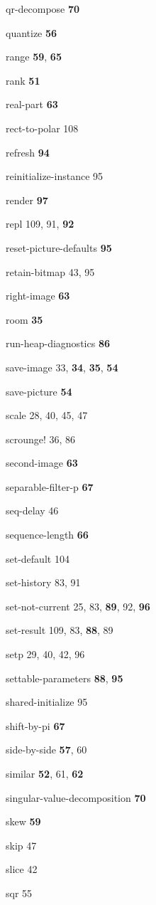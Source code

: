 \begin{theindex}
\item qr-decompose {\bf 70}
\item quantize {\bf 56}
\item range {\bf 59}, {\bf 65}
\item rank {\bf 51}
\item real-part {\bf 63}
\item rect-to-polar 108
\item refresh {\bf 94}
\item reinitialize-instance 95
\item render {\bf 97}
\item repl 109, 91, {\bf 92}
\item reset-picture-defaults {\bf 95}
\item retain-bitmap 43, 95
\item right-image {\bf 63}
\item room {\bf 35}
\item run-heap-diagnostics {\bf 86}
\item save-image 33, {\bf 34}, {\bf 35}, {\bf 54}
\item save-picture {\bf 54}
\item scale 28, 40, 45, 47
\item scrounge! 36, 86
\item second-image {\bf 63}
\item separable-filter-p {\bf 67}
\item seq-delay 46
\item sequence-length {\bf 66}
\item set-default 104
\item set-history 83, 91
\item set-not-current 25, 83, {\bf 89}, 92, {\bf 96}
\item set-result 109, 83, {\bf 88}, 89
\item setp 29, 40, 42, 96
\item settable-parameters {\bf 88}, {\bf 95}
\item shared-initialize 95
\item shift-by-pi {\bf 67}
\item side-by-side {\bf 57}, 60
\item similar {\bf 52}, 61, {\bf 62}
\item singular-value-decomposition {\bf 70}
\item skew {\bf 59}
\item skip 47
\item slice 42
\item sqr 55

\end{theindex}
